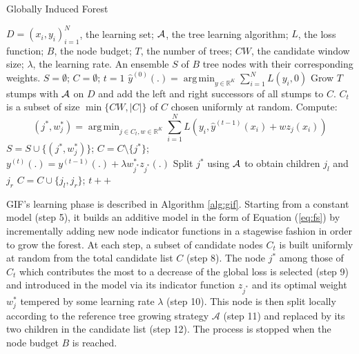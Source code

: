 \documentclass{article}
\DeclareMathOperator*{\argmin}{arg\,min}
\begin{document}
\begin{algorithm}[tb]
   \caption{Globally Induced Forest}
   \label{alg:gif}
\begin{algorithmic}[1]
     $D= (x_i,y_i)_{i=1}^N$, the learning set; ${\cal 
    A}$, the tree learning algorithm; $L$, the loss function;  $B$, the node 
    budget; $T$, the number of trees; $CW$, the candidate window size; 
    $\lambda$, the learning rate.
     An ensemble $S$ of $B$ tree nodes with their 
    corresponding weights.
    \STATE $S=\emptyset$; $C=\emptyset$; $t=1$
    \STATE $\hat{y}^{(0)}(.)= \argmin_{y \in \mathbb{R}^K} \sum_{i=1}^{N} 
    L(y_i, 0)$
    \STATE Grow $T$ stumps with ${\cal A}$ on $D$ and add the left and right 
    successors of all stumps to  $C$.    
    \REPEAT
        \STATE $C_t$ is a subset of size $\min\{CW, |C|\}$ of $C$ chosen 
        uniformly at random.
        \STATE Compute:
            \vspace{-1.5em}
            \begin{equation*}
            (j^*,w^*_j)=\argmin_{j\in C_t, w\in \mathbb{R}^K} 
            \sum_{i=1}^{N} L \left(y_i, \hat{y}^{(t-1)}(x_i) + w z_j(x_i) 
            \right)
            \end{equation*}
            \vspace{-1em}
        \STATE $S=S\cup\{(j^*,w^*_j)\}$; $C=C\setminus\{j^*\}$; \\
            $y^{(t)}(.)=y^{(t-1)}(.)+\lambda w^*_{j^*} z_{j^*}(.)$
        \STATE Split $j^*$ using ${\cal A}$ to obtain children $j_l$ and $j_r$
        \STATE $C=C\cup\{j_l,j_r\}$; $t++$
\end{algorithmic}
\end{algorithm}


GIF's learning phase is described in Algorithm \ref{alg:gif}.
Starting from a constant model (step 5), it builds an additive model in the 
form of Equation (\ref{eq:fs}) by incrementally adding new node indicator 
functions in a stagewise fashion in order to grow the forest.
At each step, a subset of candidate nodes $C_t$ is built uniformly at random 
from the total candidate list $C$ (step 8). The node $j^*$ among those of $C_t$ 
which contributes the most to a decrease of the global loss is selected (step 
9) and introduced in the model via its indicator function $z_{j^*}$ and its 
optimal weight $w^*_j$ tempered by some learning rate $\lambda$ (step 10). This 
node is then split locally according to the reference tree growing strategy 
$\mathcal{A}$ (step 11) and replaced by its two children in the candidate list 
(step 12). The process is stopped when the node budget $B$ is reached. 
\end{document}
